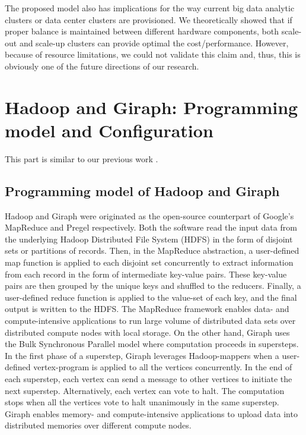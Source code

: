 \documentclass[journal]{IEEEtran}
\begin{document}
The proposed model also has implications for the way current big data analytic clusters or data center clusters are provisioned. We theoretically showed that if proper balance is maintained between different hardware components, both scale-out and scale-up clusters can provide optimal the cost/performance.  However, because of resource limitations, we could not validate this claim and, thus, this is obviously one of the future directions of our research.

\appendices
\section{Hadoop and Giraph: Programming model and Configuration}
This part is similar to our previous work \cite{scaleupscaleout:das2015evaluating}.
 \label{app:HadoopConfigurationsAndoptimizations}
\subsection{Programming model of Hadoop and Giraph}
Hadoop and Giraph were originated as the open-source counterpart of Google's MapReduce \cite{fw:mapreduce} and Pregel \cite{fw:pregel} respectively. Both the software read the input data from the underlying Hadoop Distributed File System (HDFS) in the form of disjoint sets or partitions of records. Then, in the MapReduce abstraction, a user-defined map function is applied to each disjoint set concurrently to extract information from each record in the form of intermediate key-value pairs. These key-value pairs are then grouped by the unique keys and shuffled to the reducers. Finally, a user-defined reduce function is applied to the value-set of each key, and the final output is written to the HDFS. The MapReduce framework enables data- and compute-intensive applications to run large volume of distributed data sets over distributed compute nodes with local storage. On the other hand, Giraph uses the Bulk Synchronous Parallel model \cite{fw:bsp} where computation proceeds in supersteps. In the first phase of a superstep, Giraph leverages Hadoop-mappers when a user-defined vertex-program is applied to all the vertices concurrently. In the end of each superstep, each vertex can send a message to other vertices to initiate the next superstep. Alternatively, each vertex can vote to halt. The computation stops when all the vertices vote to halt unanimously in the same superstep. Giraph enables memory- and compute-intensive applications to upload data into distributed memories over different compute nodes.
 
\end{document}
